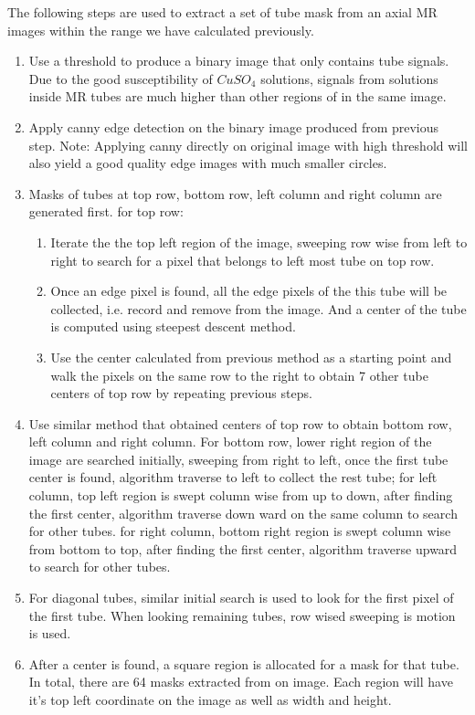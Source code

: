 The following steps are used to extract a set of tube mask from an axial MR images within the range we have
calculated previously.
\begin{enumerate}
\item Use a threshold to produce a binary image that only contains tube signals. 
  Due to the good susceptibility of $CuSO_4$ solutions, signals from solutions inside MR tubes are much
  higher than other regions of in the same image.
\item Apply canny edge detection on the binary image produced from previous step. Note: Applying canny
  directly on original image with high threshold will also yield a good quality edge images with much
  smaller circles.
\item Masks of tubes at top row, bottom row, left column  and right column are generated first. 
  for top row:
  \begin{enumerate}
  \item Iterate the the top left region of the image, sweeping row wise from left to right to search 
    for a pixel that belongs to left most tube on top row.
  \item Once an edge pixel is found, all the edge pixels of the this tube will be collected, i.e. record and 
    remove from the image. And a center of the tube is computed using steepest descent method. 
  \item Use the center calculated from previous method as a starting point and walk the pixels on the same row
    to the right to obtain 7 other tube centers of top row by repeating previous steps.
  \end{enumerate}
\item Use similar method that obtained centers of top row to obtain bottom row, left column and right column. 
  For bottom row, lower right region of the image are searched initially, sweeping from right to left, once
  the first tube center is found, algorithm traverse to left to collect the rest tube; 
  for left column, top left region is swept column wise from up to down, after finding the first center, 
  algorithm traverse down ward on the same column to search for other tubes.
  for right column, bottom right region is swept column wise from bottom to top, after finding the first
  center, algorithm traverse upward to search for other tubes.
\item For diagonal tubes, similar initial search is used to look for the first pixel of the first tube. 
  When looking remaining tubes, row wised sweeping is motion is used. 
\item After a center is found, a square region is allocated for a mask for that tube. In total, there are 64
  masks extracted from on image. Each region will have it's top left coordinate on the image as well as 
  width and height.
\end{enumerate}

